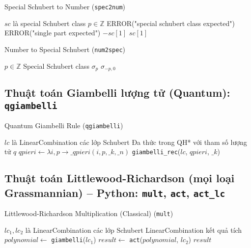 \begin{algorithm}[H]
\caption{Special Schubert to Number (\texttt{spec2num})}
\begin{algorithmic}[1]
\REQUIRE $sc$ là special Schubert class
\ENSURE $p \in \mathbb{Z}$
    \STATE ERROR("special schubert class expected")
\ENDIF
{}
    \STATE ERROR("single part expected")
\ENDIF
{}
    \RETURN $-sc[1]$
\ELSE
    \RETURN $sc[1]$
\ENDIF
\end{algorithmic}
\end{algorithm}

\begin{algorithm}[H]
\caption{Number to Special Schubert (\texttt{num2spec})}
\begin{algorithmic}[1]
\REQUIRE $p \in \mathbb{Z}$
\ENSURE Special Schubert class
    \RETURN $\sigma_p$
\ELSE
    \RETURN $\sigma_{-p,0}$
\ENDIF
\end{algorithmic}
\end{algorithm}

\subsection*{Thuật toán Giambelli lượng tử (Quantum): \texttt{qgiambelli}}

\begin{algorithm}[H]
\caption{Quantum Giambelli Rule (\texttt{qgiambelli})}
\begin{algorithmic}[1]
\REQUIRE $lc$ là LinearCombination các lớp Schubert
\ENSURE Đa thức trong QH* với tham số lượng tử $q$
\STATE $qpieri \gets \lambda i, p \to \_qpieri(i, p, \_k, \_n)$
\RETURN \texttt{giambelli\_rec}($lc$, $qpieri$, $\_k$)
\end{algorithmic}
\end{algorithm}


\subsection*{Thuật toán Littlewood-Richardson (mọi loại Grassmannian) -- Python: \texttt{mult}, \texttt{act}, \texttt{act\_lc}}

\begin{algorithm}[H]
\caption{Littlewood-Richardson Multiplication (Classical) (\texttt{mult})}
\begin{algorithmic}[1]
\REQUIRE $lc_1, lc_2$ là LinearCombination các lớp Schubert
\ENSURE LinearCombination kết quả tích
\STATE $polynomial \gets$ \texttt{giambelli}($lc_1$)
\STATE $result \gets$ \texttt{act}($polynomial$, $lc_2$)
\RETURN $result$
\end{algorithmic}
\end{algorithm}

